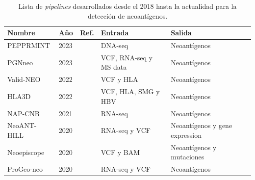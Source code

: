 \documentclass[a4paper]{article}
\begin{document}


	
\begin{table}[h]
	\caption{Lista de \textit{pipelines} desarrollados desde el 2018 hasta la actualidad para la detección de neoantígenos.}
	\label{tab:review_pipelines}
	\setlength{\tabcolsep}{0.5em} %
	{\renewcommand{\arraystretch}{1.5}%
		
	
			\begin{tabular}{lp{0.6cm}p{3cm}p{4.5cm}p{2.7cm}}
	\textbf{Nombre} & \textbf{Año}  & \textbf{Ref.}                                 & \textbf{Entrada}                                         & \textbf{Salida}                                     \\ \hline
	
	PEPPRMINT         & 2023 &\cite{zhou2023prioritizing}         & DNA-seq                                                  & Neoantígenos                                        \\

	PGNneo & 2023	& \cite{tan2023pgnneo}	& VCF, RNA-seq y MS data	& Neoantígenos \\
	
	Valid-NEO       & 2022 &\cite{terai2022valid}             & VCF y HLA          & Neoantígenos  \\
	
	HLA3D & 2022	& \cite{li2022hla3d}	& VCF, HLA, SMG y HBV	& Neoantígenos \\
	
	
	
	NAP-CNB         & 2021 &\cite{wert2021predicting}         & RNA-seq                                                  & Neoantígenos                                       \\
	
	NeoANT-HILL     & 2020 &\cite{coelho2020neoant}           & RNA-seq y VCF                        & Neoantígenos y gene expression  \\
	
	Neoepiscope     & 2020 &\cite{wood2020neoepiscope}        & VCF y BAM                   & Neoantígenos y mutaciones                          \\
	
	ProGeo-neo      & 2020 &\cite{li2020progeo}               & RNA-seq y VCF                        & Neoantígenos                                       \\
	

\end{tabular}}
\end{table}
\end{document}
